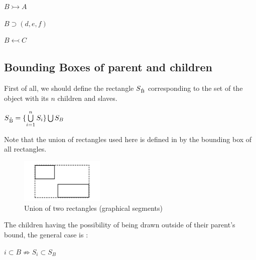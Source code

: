 \documentclass[a4paper]{article}
\newcommand{\parent}			{\supset}
\newcommand{\child}			{\subset}
\newcommand{\master}			{\leftarrowtail}
\newcommand{\slave}			{\rightarrowtail}
\begin{document}
 $B \slave A$

 $B \parent (d, e, f)$

 $B \master C$



\subsection{Bounding Boxes of parent and children}\label{subsec:bb}

First of all, we should define the rectangle $S\textsubscript{\r{B}}$ corresponding to the set of the object with its $n$ children and slaves. 

\begin{center} $ S\textsubscript{\r{B}}  =\{ \bigcup \limits_{i=1}^n S_i \} \bigcup S_B$ \end{center}

Note that the union of rectangles used here is defined in \cite{fober12cmj2} by the bounding box of all rectangles.%

\begin{figure}[h]
\centering
\includegraphics[width=40mm]{img/rect.png}
\caption{Union of two rectangles (graphical segments)}
\label{fig:rectunion}
\end{figure}

The children having the possibility of being drawn outside of their parent's bound, the general case is : 
\begin{center} $i \child B \nRightarrow S_i \subset S_B$ \end{center}
\end{document}
